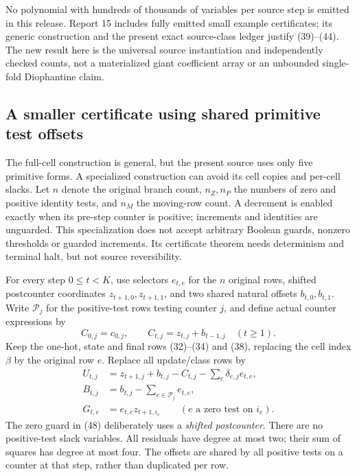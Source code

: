 \documentclass[11pt,a4paper]{article}
\numberwithin{equation}{section}
\begin{document}
No polynomial with hundreds of thousands of variables per source step is
emitted in this release. Report 15 includes fully emitted small example
certificates; its generic construction and the present exact source-class
ledger justify (39)--(44). The new result here is the universal source
instantiation and independently checked counts, not a materialized giant
coefficient array or an unbounded single-fold Diophantine claim.
\subsection{A smaller certificate using shared primitive test offsets}\label{fpa:ls:sec:direct}
The full-cell construction is general, but the present source uses only five
primitive forms. A specialized construction can avoid its cell copies and
per-cell slacks. Let $n$ denote the original branch count, $n_Z,n_P$ the
numbers of zero and positive identity tests, and $n_M$ the moving-row count.
A decrement is enabled exactly when its pre-step counter is positive;
increments and identities are unguarded. This specialization does not accept
arbitrary Boolean guards, nonzero thresholds or guarded increments. Its
certificate theorem needs determinism and terminal halt, but not source
reversibility.

For every step $0\le t<K$, use selectors $e_{t,e}$ for the $n$ original
rows, shifted postcounter coordinates $z_{t+1,0},z_{t+1,1}$, and two shared
natural offsets $b_{t,0},b_{t,1}$. Write $\mathcal P_j$ for the positive-test
rows testing counter $j$, and define actual counter expressions by
\[
 C_{0,j}=c_{0,j},\qquad C_{t,j}=z_{t,j}+b_{t-1,j}\quad(t\ge1).       \tag{45}
\]
Keep the one-hot, state and final rows (32)--(34) and (38), replacing the
cell index $\beta$ by the original row $e$. Replace all update/class rows by
\begin{align}
 U_{t,j}&=z_{t+1,j}+b_{t,j}-C_{t,j}
                       -\sum_e\delta_{e,j}e_{t,e},              \tag{46}\\
 B_{t,j}&=b_{t,j}-\sum_{e\in\mathcal P_j}e_{t,e},                 \tag{47}\\
 G_{t,e}&=e_{t,e}z_{t+1,i_e}\qquad(e\text{ a zero test on }i_e).  \tag{48}
\end{align}
The zero guard in (48) deliberately uses a \emph{shifted postcounter}.
There are no positive-test slack variables. All residuals have degree at most
two; their sum of squares has degree at most four. The offsets are shared by all
positive tests on a counter at that step, rather than duplicated per row.
\end{document}
